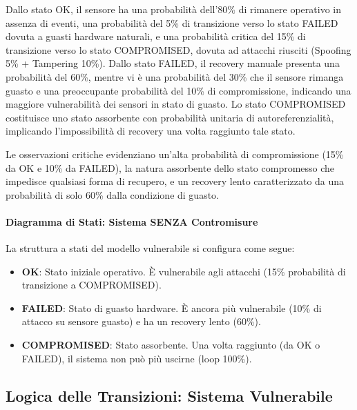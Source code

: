 Dallo stato OK, il sensore ha una probabilità dell'80\% di rimanere operativo in assenza di eventi, una probabilità del 5\% di transizione verso lo stato FAILED dovuta a guasti hardware naturali, e una probabilità critica del 15\% di transizione verso lo stato COMPROMISED, dovuta ad attacchi riusciti (Spoofing 5\% + Tampering 10\%). Dallo stato FAILED, il recovery manuale presenta una probabilità del 60\%, mentre vi è una probabilità del 30\% che il sensore rimanga guasto e una preoccupante probabilità del 10\% di compromissione, indicando una maggiore vulnerabilità dei sensori in stato di guasto. Lo stato COMPROMISED costituisce uno stato assorbente con probabilità unitaria di autoreferenzialità, implicando l'impossibilità di recovery una volta raggiunto tale stato.

Le osservazioni critiche evidenziano un'alta probabilità di compromissione (15\% da OK e 10\% da FAILED), la natura assorbente dello stato compromesso che impedisce qualsiasi forma di recupero, e un recovery lento caratterizzato da una probabilità di solo 60\% dalla condizione di guasto.

\paragraph{Diagramma di Stati: Sistema SENZA Contromisure}
La struttura a stati del modello vulnerabile si configura come segue:
\begin{itemize}
    \item \textbf{OK}: Stato iniziale operativo. È vulnerabile agli attacchi (15\% probabilità di transizione a COMPROMISED).
    \item \textbf{FAILED}: Stato di guasto hardware. È ancora più vulnerabile (10\% di attacco su sensore guasto) e ha un recovery lento (60\%).
    \item \textbf{COMPROMISED}: Stato assorbente. Una volta raggiunto (da OK o FAILED), il sistema non può più uscirne (loop 100\%).
\end{itemize}

\subsection{Logica delle Transizioni: Sistema Vulnerabile}

